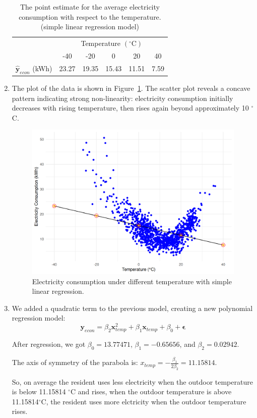 \documentclass[12pt]{article}
\begin{document}
\begin{enumerate}
\begin{table}[htpb]
	\centering
	\begin{tabular}{cccccc}
		\toprule
		\multirow{2}{*}{} &
		\multicolumn{5}{c}{Temperature $(^{\circ}\text{C})$}\\
		 & -40 & -20 & 0 & 20 & 40 \\
		\midrule
		$\hat{\mathbf{y}}_{econ}$ (kWh)&23.27&19.35&15.43&11.51&7.59\\
		\bottomrule
	\end{tabular}
	\caption{The point estimate for the average electricity consumption with respect to the temperature. (simple linear regression model)}
	\label{Tab:1}
\end{table}
\item The plot of the data is shown in Figure~\ref{Fig:1}.
The scatter plot reveals a concave pattern indicating strong non-linearity: electricity consumption initially decreases with rising temperature, then rises again beyond approximately 10 $^{\circ}$C.
\begin{figure}[htbp]
\includegraphics[width=.7\textwidth]{1.png}
\centering
\caption{Electricity consumption under different temperature with simple linear regression.}
\label{Fig:1}
\end{figure}
\item We added a quadratic term to the previous model, creating a new polynomial regression model:
\[
\mathbf{y}_{econ} = \beta_2 \mathbf{x}_{temp}^{2}
+\beta_1 \mathbf{x}_{temp} + \beta_0 + \mathbf{\epsilon}
\] 

After regression, we got $\beta_0 = 13.77471$, $\beta_1 = -0.65656$, and $\beta_2 = 0.02942$.

The axis of symmetry of the parabola is: $x_{temp} =  -\frac{\beta_1}{2\beta_2} = 11.15814$.

So, on average the resident uses less electricity when the outdoor temperature is below 11.15814 $^{\circ}$C and rises, when the outdoor temperature is above 11.15814$^{\circ}$C, the resident uses more elctricity when the outdoor temperature rises.


\end{enumerate}
\end{document}
